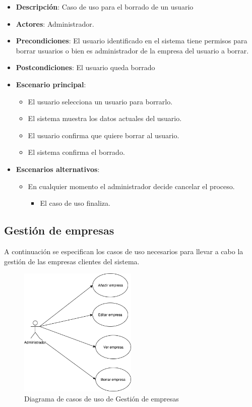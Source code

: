 \documentclass[12pt,a4paperpaper,]{report}
\providecommand{\tightlist}{%
  \setlength{\itemsep}{0pt}\setlength{\parskip}{0pt}}
\begin{document}
\begin{itemize}
\tightlist
\item
  \textbf{Descripción}: Caso de uso para el borrado de un usuario
\item
  \textbf{Actores}: Administrador.
\item
  \textbf{Precondiciones}: El usuario identificado en el sistema tiene
  permisos para borrar usuarios o bien es administrador de la empresa
  del usuario a borrar.
\item
  \textbf{Postcondiciones}: El usuario queda borrado
\item
  \textbf{Escenario principal}:

  \begin{itemize}
  \tightlist
  \item
    El usuario selecciona un usuario para borrarlo.
  \item
    El sistema muestra los datos actuales del usuario.
  \item
    El usuario confirma que quiere borrar al usuario.
  \item
    El sistema confirma el borrado.
  \end{itemize}
\item
  \textbf{Escenarios alternativos}:

  \begin{itemize}
  \tightlist
  \item
    En cualquier momento el administrador decide cancelar el proceso.

    \begin{itemize}
    \tightlist
    \item
      El caso de uso finaliza.
    \end{itemize}
  \end{itemize}
\end{itemize}

\subsection{Gestión de empresas}\label{gestiuxf3n-de-empresas}

A continuación se especifican los casos de uso necesarios para llevar a
cabo la gestión de las empresas clientes del sistema.

\begin{figure}
\centering
\includegraphics[width=0.50000\textwidth]{source/figures/gestion-empresas.png}
\caption{Diagrama de casos de uso de Gestión de empresas
\label{gestion_empresas}}
\end{figure}
\end{document}
